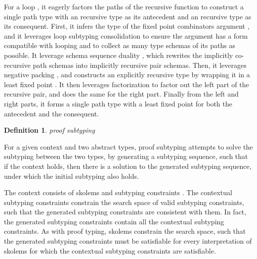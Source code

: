 \documentclass[acmsmall]{acmart}
\theoremstyle{definition}
\newtheorem{definition}{Definition}[section]
\begin{document}
For a loop , 
it eagerly factors the paths of the recursive function 
to construct a single path type 
with an recursive type as its antecedent and an recursive type as its consequent. 
First, it infers the type of the fixed point combinators argument ,
and it leverages loop subtyping consolidation 
to ensure the argument has a  
form compatible with looping and 
to collect as many type schemas of its paths as possible.  
It leverage schema sequence duality 
\ms{
  \alpha_\nu \downarrow \Pi_\nu
  \fallingdotseq 
  \alpha_\mu \uparrow \Pi_\mu
}, which rewrites the implicitly co-recursive path schemas into
implicitly recursive pair schemas. 
Then, it leverages negative packing ,
and constructs an explicitly recursive type by wrapping it in a least fixed point
.
It then leverages factorization  to factor out the left part of the recursive pair, and does the same for the right part. 
Finally from the left and right parts, it forms a single path type
with a least fixed point for both the antecedent and the consequent. 


\begin{definition} 
  \label{def:proof_subtyping}
  \emph{proof subtyping}
  \hfill
  \small
\end{definition}

\noindent
For a given context and two abstract types,
proof subtyping attempts to solve the subtyping between the two types,
by generating a subtyping sequence, such that if the context holds,
then there is a solution to the generated subtyping sequence, under which   
the initial subtyping also holds. 

The context consists of skolems \ms{\Theta} and subtyping constraints \ms{\Delta}. 
The contextual subtyping constraints constrain the search space of valid subtyping constraints, 
such that the generated subtyping constraints are consistent with them. 
In fact, the generated subtyping constraints contain all the contextual subtyping constraints.
As with proof typing, skolems constrain the search space,
such that the generated subtyping constraints must be satisfiable
for every interpretation of skolems for which the contextual subtyping constraints are satisfiable.
\end{document}
